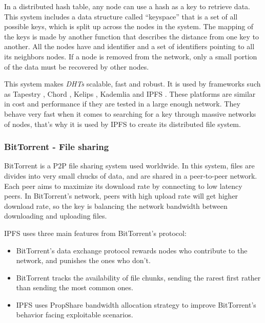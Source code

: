 In a distributed hash table, any node can use a hash as a key to retrieve data.
This system includes a data structure called ``keyspace'' that is a set of all
possible keys, which is split up across the nodes in the system. The mapping of
the keys is made by another function that describes the distance from one key to
another. All the nodes have and identifier and a set of identifiers pointing to
all its neighbors nodes. If a node is removed from the network, only a small
portion of the data must be recovered by other
nodes\cite{kaluszka2010distributed}.

This system makes \emph{DHTs} scalable, fast and robust. It is used by
frameworks such as Tapestry \cite{zhao2004tapestry}, Chord
\cite{stoica2001chord}, Kelips \cite{gupta2003kelips}, Kademlia
\cite{maymounkov2002kademlia} and IPFS \cite{benet2014ipfs}. These platforms are
similar in cost and performance if they are tested in a large enough network.
They behave very fast when it comes to searching for a key through massive
networks of nodes\cite{li2004comparing}, that's why it is used by IPFS to create
its distributed file system.

\subsubsection{BitTorrent - File sharing}
BitTorrent \cite{cohen2003incentives} is a P2P file sharing system used
worldwide. In this system, files are divides into very small chucks of data, and
are shared in a peer-to-peer network. Each peer aims to maximize its download
rate by connecting to low latency peers. In BitTorrent's network, peers with
high upload rate will get higher download rate, so the key is balancing the
network bandwidth between downloading and uploading
files\cite{pouwelse2005bittorrent}.

IPFS uses three main features from BitTorrent's protocol\cite{benet2014ipfs}:
\begin{itemize}
\item BitTorrent's data exchange protocol rewards nodes who contribute to the
  network, and punishes the ones who don't.
\item BitTorrent tracks the availability of file chunks, sending the rarest
  first rather than sending the most common ones.
\item IPFS uses PropShare\cite{levin2008bittorrent} bandwidth allocation
  strategy to improve BitTorrent's behavior facing exploitable scenarios.
\end{itemize}

